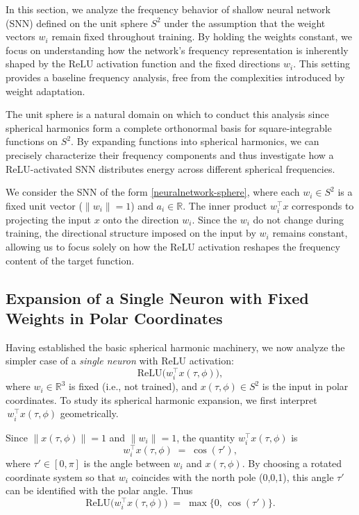 \documentclass[review,onefignum,onetabnum,onealgnum]{siamart250106}
\numberwithin{theorem}{section}
\begin{document}
In this section, we analyze the frequency behavior of shallow neural network (SNN) defined on the unit sphere \( S^2  \) under the assumption that the weight vectors \( w_i \) remain fixed throughout training. By holding the weights constant, we focus on understanding how the network’s frequency representation is inherently shaped by the ReLU activation function and the fixed directions \( w_i \). This setting provides a baseline frequency analysis, free from the complexities introduced by weight adaptation.

The unit sphere is a natural domain on which to conduct this analysis since spherical harmonics form a complete orthonormal basis for square-integrable functions on \( S^2 \). By expanding functions into spherical harmonics, we can precisely characterize their frequency components and thus investigate how a ReLU-activated SNN distributes energy across different spherical frequencies.

We consider the SNN of the form \eqref{neuralnetwork-sphere}, where each \( w_i \in S^2 \) is a fixed unit vector (\(\|w_i\|=1\)) and \( a_i \in \mathbb{R} \). The inner product \( w_i^\top x \) corresponds to projecting the input \( x \) onto the direction \( w_i \). Since the \( w_i \) do not change during training, the directional structure imposed on the input by \( w_i \) remains constant, allowing us to focus solely on how the ReLU activation reshapes the frequency content of the target function.  



\subsection{Expansion of a Single Neuron with Fixed Weights in Polar Coordinates}
\label{Sec:SingleNeuronExpansion}

Having established the basic spherical harmonic machinery, we now analyze the simpler case of a \emph{single neuron} with ReLU activation:
\[
\mathrm{ReLU}\bigl(w_i^\top x(\tau,\phi)\bigr),
\]
where \(w_i\in\mathbb{R}^3\) is fixed (i.e., not trained), and \(x(\tau,\phi)\in S^2\) is the input in polar coordinates.  
To study its spherical harmonic expansion, we first interpret \(\,w_i^\top x(\tau,\phi)\) geometrically.

Since \(\|x(\tau,\phi)\|=1\) and  \(\|w_i\|=1\), the quantity \(w_i^\top x(\tau,\phi)\) is 
\[
w_i^\top x(\tau,\phi)
\;=\;
\cos(\tau'),
\]
where \(\tau'\in[0,\pi]\) is the angle between \(w_i\) and \(x(\tau,\phi)\).  By choosing a rotated coordinate system so that \(w_i\) coincides with the north pole (0,0,1), this angle \(\tau'\) can be identified with the polar angle.  Thus
\begin{equation}
\label{NeuronCosTau}
\mathrm{ReLU}\bigl(w_i^\top x(\tau,\phi)\bigr)
\;=\;
\max\!\bigl\{0,\,\cos(\tau')\bigr\}.
\end{equation}
\end{document}
